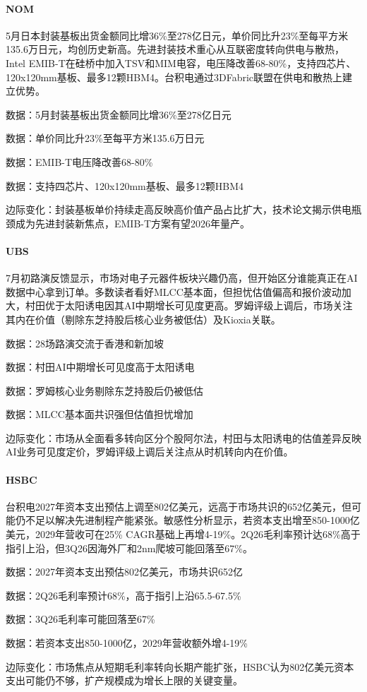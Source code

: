 \documentclass[11pt]{ctexart}
\begin{document}
\paragraph{NOM} 5月日本封装基板出货金额同比增36\%至278亿日元，单价同比升23\%至每平方米135.6万日元，均创历史新高。先进封装技术重心从互联密度转向供电与散热，Intel EMIB-T在硅桥中加入TSV和MIM电容，电压降改善68-80\%，支持四芯片、120x120mm基板、最多12颗HBM4。台积电通过3DFabric联盟在供电和散热上建立优势。
{\small\color{refgray}数据：5月封装基板出货金额同比增36\%至278亿日元\par}
{\small\color{refgray}数据：单价同比升23\%至每平方米135.6万日元\par}
{\small\color{refgray}数据：EMIB-T电压降改善68-80\%\par}
{\small\color{refgray}数据：支持四芯片、120x120mm基板、最多12颗HBM4\par}
{\small\color{refgray}边际变化：封装基板单价持续走高反映高价值产品占比扩大，技术论文揭示供电瓶颈成为先进封装新焦点，EMIB-T方案有望2026年量产。\par}
\paragraph{UBS} 7月初路演反馈显示，市场对电子元器件板块兴趣仍高，但开始区分谁能真正在AI数据中心拿到订单。多数读者看好MLCC基本面，但担忧估值偏高和报价波动加大，村田优于太阳诱电因其AI中期增长可见度更高。罗姆评级上调后，市场关注其内在价值（剔除东芝持股后核心业务被低估）及Kioxia关联。
{\small\color{refgray}数据：28场路演交流于香港和新加坡\par}
{\small\color{refgray}数据：村田AI中期增长可见度高于太阳诱电\par}
{\small\color{refgray}数据：罗姆核心业务剔除东芝持股后仍被低估\par}
{\small\color{refgray}数据：MLCC基本面共识强但估值担忧增加\par}
{\small\color{refgray}边际变化：市场从全面看多转向区分个股阿尔法，村田与太阳诱电的估值差异反映AI业务可见度定价，罗姆评级上调后关注点从时机转向内在价值。\par}
\paragraph{HSBC} 台积电2027年资本支出预估上调至802亿美元，远高于市场共识的652亿美元，但可能仍不足以解决先进制程产能紧张。敏感性分析显示，若资本支出增至850-1000亿美元，2029年营收可在25\% CAGR基础上再增4-19\%。2Q26毛利率预计达68\%高于指引上沿，但3Q26因海外厂和2nm爬坡可能回落至67\%。
{\small\color{refgray}数据：2027年资本支出预估802亿美元，市场共识652亿\par}
{\small\color{refgray}数据：2Q26毛利率预计68\%，高于指引上沿65.5-67.5\%\par}
{\small\color{refgray}数据：3Q26毛利率可能回落至67\%\par}
{\small\color{refgray}数据：若资本支出850-1000亿，2029年营收额外增4-19\%\par}
{\small\color{refgray}边际变化：市场焦点从短期毛利率转向长期产能扩张，HSBC认为802亿美元资本支出可能仍不够，扩产规模成为增长上限的关键变量。\par}
\end{document}

